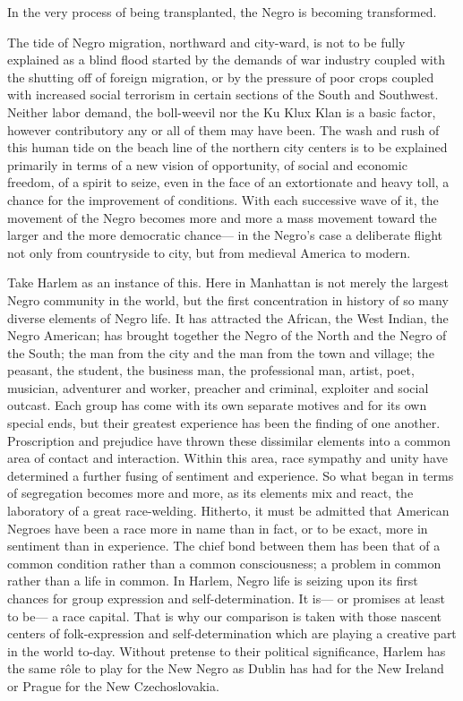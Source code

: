 \documentclass[12pt]{article}
\begin{document}
In the very process of being transplanted, the Negro is becoming transformed.

The tide of Negro migration, northward and city-ward, is not to be fully explained as a blind flood started by the demands of war industry coupled with the shutting off of foreign migration, or by the pressure of poor crops coupled with increased social terrorism in certain sections of the South and Southwest. Neither labor demand, the boll-weevil nor the Ku Klux Klan is a basic factor, however contributory any or all of them may have been. The wash and rush of this human tide on the beach line of the northern city centers is to be explained primarily in terms of a new vision of opportunity, of social and economic freedom, of a spirit to seize, even in the face of an extortionate and heavy toll, a chance for the improvement of conditions. With each successive wave of it, the movement of the Negro becomes more and more a mass movement toward the larger and the more democratic chance--- in the Negro's case a deliberate flight not only from countryside to city, but from medieval America to modern.

Take Harlem as an instance of this. Here in Manhattan is not merely the largest Negro community in the world, but the first concentration in history of so many diverse elements of Negro life. It has attracted the African, the West Indian, the Negro American; has brought together the Negro of the North and the Negro of the South; the man from the city and the man from the town and village; the peasant, the student, the business man, the professional man, artist, poet, musician, adventurer and worker, preacher and criminal, exploiter and social outcast. Each group has come with its own separate motives and for its own special ends, but their greatest experience has been the finding of one another. Proscription and prejudice have thrown these dissimilar elements into a common area of contact and interaction. Within this area, race sympathy and unity have determined a further fusing of sentiment and experience. So what began in terms of segregation becomes more and more, as its elements mix and react, the laboratory of a great race-welding. Hitherto, it must be admitted that American Negroes have been a race more in name than in fact, or to be exact, more in sentiment than in experience. The chief bond between them has been that of a common condition rather than a common consciousness; a problem in common rather than a life in common. In Harlem, Negro life is seizing upon its first chances for group expression and self-determination. It is--- or promises at least to be--- a race capital. That is why our comparison is taken with those nascent centers of folk-expression and self-determination which are playing a creative part in the world to-day. Without pretense to their political significance, Harlem has the same rôle to play for the New Negro as Dublin has had for the New Ireland or Prague for the New Czechoslovakia.
\end{document}
